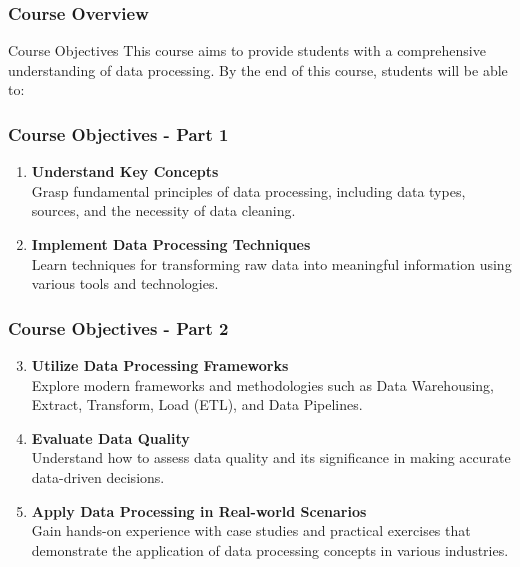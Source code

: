 \documentclass{beamer}
\begin{document}
\begin{frame}[fragile]
    \frametitle{Course Overview}
    \begin{block}{Course Objectives}
    This course aims to provide students with a comprehensive understanding of data processing. By the end of this course, students will be able to:
    \end{block}
\end{frame}

\begin{frame}[fragile]
    \frametitle{Course Objectives - Part 1}
    \begin{enumerate}
        \item \textbf{Understand Key Concepts} \\
        Grasp fundamental principles of data processing, including data types, sources, and the necessity of data cleaning.
        
        \item \textbf{Implement Data Processing Techniques} \\
        Learn techniques for transforming raw data into meaningful information using various tools and technologies.
    \end{enumerate}
\end{frame}

\begin{frame}[fragile]
    \frametitle{Course Objectives - Part 2}
    \begin{enumerate}
        \setcounter{enumi}{2} %
        \item \textbf{Utilize Data Processing Frameworks} \\
        Explore modern frameworks and methodologies such as Data Warehousing, Extract, Transform, Load (ETL), and Data Pipelines.
        
        \item \textbf{Evaluate Data Quality} \\
        Understand how to assess data quality and its significance in making accurate data-driven decisions.
        
        \item \textbf{Apply Data Processing in Real-world Scenarios} \\
        Gain hands-on experience with case studies and practical exercises that demonstrate the application of data processing concepts in various industries.
    \end{enumerate}
\end{frame}
\end{document}
